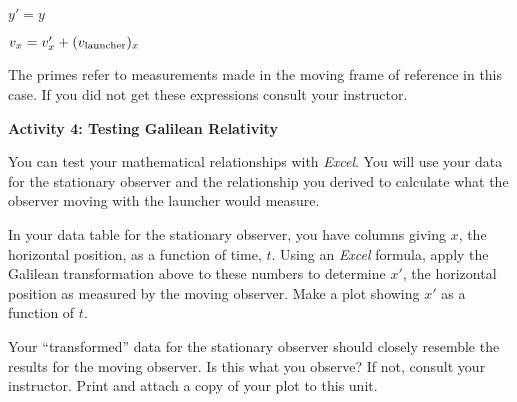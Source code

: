 {\centering \( y'=y \)\par}

{\centering \( v_{x}=v_{x}'+(v_{\rm launcher})_{x} \)\par}

The primes refer to measurements made in the moving frame of reference
in this case. If you did not get these expressions consult your instructor.

\textbf{Activity 4: Testing Galilean Relativity}

You can test your mathematical relationships with 
\emph{Excel}. You will use your data for the stationary
observer and the relationship you derived to calculate what the observer
moving with the launcher would measure.

In your data table for the stationary observer, you have
columns giving $x$, the horizontal position, as a function
of time, $t$.  Using an \textit{Excel} formula, apply the 
Galilean transformation above to these numbers to determine
$x'$, the horizontal position as measured by the moving observer.
Make a plot showing $x'$ as a function of $t$.

Your {}``transformed'' data for the stationary observer should
closely resemble the results for the moving observer. Is this what
you observe? If not, consult your instructor. Print and attach a copy
of your plot to this unit.
